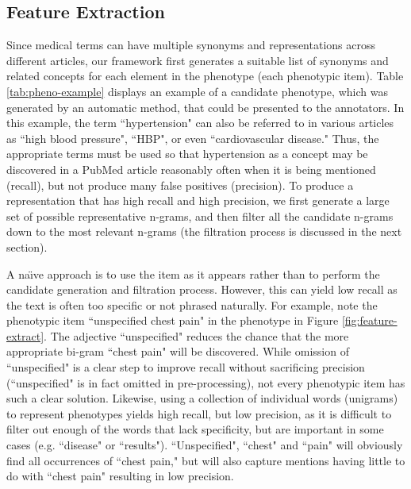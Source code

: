\documentclass{sig-alternate-05-2015}
\newcommand{\kibitz}[2]{\ifnum\Comments=1\textcolor{#1}{#2}\fi}
\newcommand{\jette}[1]{\kibitz{red}      {[Jette: #1]}}
\begin{document}
\subsection{Feature Extraction}
Since medical terms can have multiple synonyms and representations across different articles, our framework first generates a suitable list of synonyms and related concepts for each element in the phenotype (each phenotypic item).
Table \ref{tab:pheno-example} displays an example of a candidate phenotype, which was generated by an automatic method, that could be presented to the annotators.
In this example, the term ``hypertension" can also be referred to in various articles as ``high blood pressure", ``HBP", or even ``cardiovascular disease."
Thus, the appropriate terms must be used so that hypertension as a concept may be discovered in a PubMed article reasonably often when it is being mentioned (recall), but not produce many false positives (precision).
To produce a representation that has high recall and high precision, we first generate a large set of possible representative n-grams, and then filter all the candidate n-grams down to the most relevant n-grams (the filtration process is discussed in the next section).

A na\"{\i}ve approach is to use the item as it appears rather than to perform the candidate generation and filtration process.
However, this can yield low recall as the text is often too specific or not phrased naturally.
For example, note the phenotypic item ``unspecified chest pain" in the phenotype in Figure \ref{fig:feature-extract}. 
The adjective ``unspecified" reduces the chance that the more appropriate bi-gram ``chest pain" will be discovered. 
While omission of ``unspecified" is a clear step to improve recall without sacrificing precision (``unspecified" is in fact omitted in pre-processing), not every phenotypic item has such a clear solution.
Likewise, using a collection of individual words (unigrams) to represent phenotypes yields high recall, but low precision, as it is difficult to filter out enough of the words that lack specificity, but are important in some cases (e.g. ``disease" or ``results").
``Unspecified", ``chest" and ``pain" will obviously find all occurrences of ``chest pain," but will also capture mentions having little to do with ``chest pain" resulting in low precision.
\end{document}
